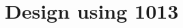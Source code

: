  \begin{center}




 \end{center}



\section{Design using 1013}


 \begin{center}




 \end{center}



